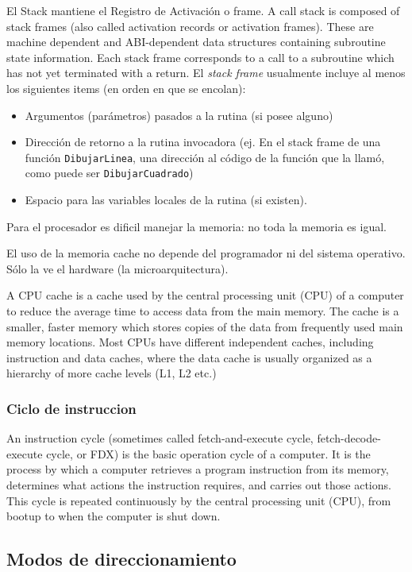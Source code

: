\documentclass[a4paper, twoside]{article}
\begin{document}
El Stack mantiene el Registro de Activación o frame. A call stack is composed of stack frames (also called activation records or activation frames). These are machine dependent and ABI-dependent data structures containing subroutine state information. Each stack frame corresponds to a call to a subroutine which has not yet terminated with a return.
El \emph{stack frame} usualmente incluye al menos los siguientes items (en orden en que se encolan):
\begin{itemize}
	\item Argumentos (parámetros) pasados a la rutina (si posee alguno)
	\item Dirección de retorno a la rutina invocadora (ej. En el stack frame de una función \texttt{DibujarLinea}, una dirección al código de la función que la llamó, como puede ser \texttt{DibujarCuadrado})
	\item Espacio para las variables locales de la rutina (si existen).
\end{itemize}

Para el procesador es dificil manejar la memoria: no toda la memoria es igual.

El uso de la memoria cache no depende del programador ni del sistema operativo. Sólo la ve el hardware (la microarquitectura).

A CPU cache is a cache used by the central processing unit (CPU) of a computer to reduce the average time to access data from the main memory. The cache is a smaller, faster memory which stores copies of the data from frequently used main memory locations. Most CPUs have different independent caches, including instruction and data caches, where the data cache is usually organized as a hierarchy of more cache levels (L1, L2 etc.)

\subsubsection{Ciclo de instruccion}
An instruction cycle (sometimes called fetch-and-execute cycle, fetch-decode-execute cycle, or FDX) is the basic operation cycle of a computer. It is the process by which a computer retrieves a program instruction from its memory, determines what actions the instruction requires, and carries out those actions. This cycle is repeated continuously by the central processing unit (CPU), from bootup to when the computer is shut down.

\subsection{Modos de direccionamiento}
\end{document}
